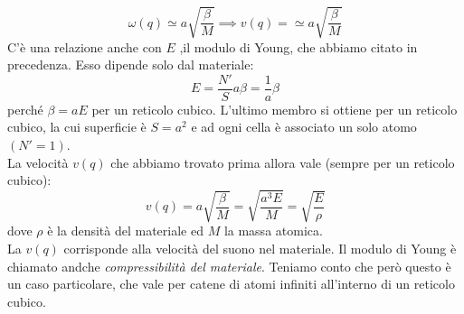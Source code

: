 \documentclass{book}
\begin{document}
        $$\omega(q) \simeq a \sqrt{\frac{\beta}{M}} \implies v(q) = \simeq a \sqrt{\frac{\beta}{M}}$$
        C'è una relazione anche con $E$ ,il modulo di Young, che abbiamo citato in precedenza. Esso dipende solo dal materiale:
        $$E = \frac{N'}{S}a\beta = \frac{1}{a}\beta$$
        perché $\beta = aE$ per un reticolo cubico.
        L'ultimo membro si ottiene per un reticolo cubico, la cui superficie è $S=a^{2}$ e ad ogni cella è associato un solo atomo $(N'=1)$. \\
        La velocità $v(q)$ che abbiamo trovato prima allora vale (sempre per un reticolo cubico):
        $$v(q) = a \sqrt{\frac{\beta}{M}} = \sqrt{\frac{a^{3}E}{M}} = \sqrt{\frac{E}{\rho}}$$
        dove $\rho$ è la densità del materiale ed $M$ la massa atomica.\\
        La $v(q)$ corrisponde alla velocità del suono nel materiale. Il modulo di Young è chiamato andche \textit{compressibilità del materiale}. Teniamo conto che però questo è un caso particolare, che vale per catene di atomi infiniti all'interno di un reticolo cubico.
\end{document}
